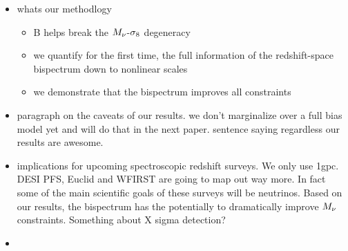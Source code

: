 
\begin{itemize}
\item whats our methodlogy 
\begin{itemize}
    \item B helps break the $M_\nu$-$\sigma_8$ degeneracy 
    \item we quantify for the first time, the full information of the redshift-space bispectrum down to nonlinear scales 
    \item we demonstrate that the bispectrum improves all constraints 
\end{itemize}
\item paragraph on the caveats of our results. we don't marginalize over a full bias model yet and will do that in the next paper. sentence saying regardless our results are awesome.
\item implications for upcoming spectroscopic redshift surveys. We only use 1gpc. DESI PFS, Euclid and WFIRST are going to map out way more. In fact some of the main scientific goals of these surveys will be neutrinos. Based on our results, the bispectrum has the potentially to dramatically improve $M_\nu$ constraints. Something about X sigma detection?  
\item 
\end{itemize}


